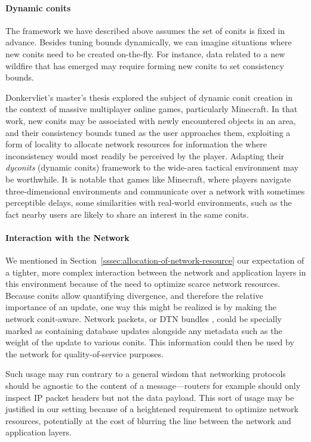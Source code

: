 \documentclass[]             %
{NASA}                       %
\theoremstyle{definition}
\begin{document}
\paragraph{Dynamic conits}
The framework we have described above assumes the set of conits is
fixed in advance. Besides tuning bounds dynamically, we can imagine
situations where new conits need to be created on-the-fly. For
instance, data related to a new wildfire that has emerged may require
forming new conits to set consistency bounds.

Donkervliet's master's thesis \cite{dyconits} explored the subject of
dynamic conit creation in the context of massive multiplayer online
games, particularly Minecraft. In that work, new conits may be
associated with newly encountered objects in an area, and their
consistency bounds tuned as the user approaches them, exploiting a
form of locality to allocate network resources for information the
where inconsistency would most readily be perceived by the
player. Adapting their \emph{dyconits} (dynamic conits) framework to
the wide-area tactical environment may be worthwhile. It is notable
that games like Minecraft, where players navigate three-dimensional
environments and communicate over a network with sometimes perceptible
delays, some similarities with real-world environments, such as the
fact nearby users are likely to share an interest in the same conits.

\paragraph{Interaction with the Network}
We mentioned in Section~\ref{sssec:allocation-of-network-resource} our
expectation of a tighter, more complex interaction between the network
and application layers in this environment because of the need to
optimize scarce network resources. Because conits allow quantifying
divergence, and therefore the relative importance of an update, one
way this might be realized is by making the network
conit-aware. Network packets, or DTN bundles \cite{2021:intro-dtn},
could be specially marked as containing database updates alongside any
metadata such as the weight of the update to various conits. This
information could then be used by the network for quality-of-service
purposes.

Such usage may run contrary to a general wisdom that networking
protocols should be agnostic to the content of a message---routers for
example should only inspect IP packet headers but not the data
payload. This sort of usage may be justified in our setting because of
a heightened requirement to optimize network resources, potentially
at the cost of blurring the line between the network and application
layers.
\end{document}

